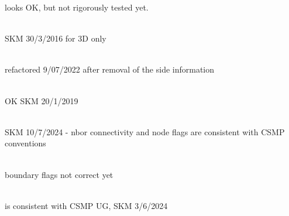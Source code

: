 \begin{DoxyRefList}
\label{test__test000073}%
%
looks OK, but not rigorously tested yet.  
\item[Member \doxylink{namespacecsmp_af885c51d2b360d64e5af0d6790f6076d}{csmp\+::check\+Neighbor\+Normals\+For\+Consistent\+Orientation} (const \doxylink{classcsmp_1_1_region}{Region$<$ 3\+U $>$} \&subdomain)]\hfill \\
\label{test__test000048}%
%
SKM 30/3/2016 for 3D only 
\item[Member \doxylink{namespacecsmp_a82f94771885b8a2a53898e22fe91e492}{csmp\+::consistency\+Check} (const \doxylink{classcsmp_1_1_node_manifold}{Node\+Manifold$<$ dim $>$} \&, bool verbose)]\hfill \\
\label{test__test000052}%
%
refactored 9/07/2022 after removal of the side information 
\item[Member \doxylink{namespacecsmp_ad6b8e1a9caaeee91e91c5f0dcfc9a749}{csmp\+::continuous\+Phases} (const variables\+::\+Variable\+Set\+\_\+\+CO2\+Geo\+Sequestration \&, const \doxylink{classcsmp_1_1_element}{Element$<$ dim $>$} \texorpdfstring{$\ast$}{*})]\hfill \\
\label{test__test000003}%
%
OK SKM 20/1/2019  
\item[Member \doxylink{namespacecsmp_a8f83c65cbfadca7865be2a363faf9f8f}{csmp\+::create\+\_\+\+Hexahedra\+\_\+\+VSet} (\doxylink{classcsmp_1_1_v_set}{VSet$<$ 3\+U $>$} \&, bool b\+Skewed=false)]\hfill \\
\label{test__test000076}%
%
SKM 10/7/2024 -\/ nbor connectivity and node flags are consistent with CSMP conventions  
\item[Member \doxylink{namespacecsmp_aca692e5648068a213cf50fbc84eec6fc}{csmp\+::create\+\_\+\+Pyramid\+\_\+\+Hexa\+\_\+\+VSet} (\doxylink{classcsmp_1_1_v_set}{VSet$<$ 3\+U $>$} \&, bool b\+Skewed=false)]\hfill \\
\label{test__test000077}%
%
boundary flags not correct yet  
\item[Member \doxylink{namespacecsmp_abdd3827f503fb175b6dcf432ecbeedd1}{csmp\+::create\+\_\+\+Tetra\+\_\+\+VSet} (\doxylink{classcsmp_1_1_v_set}{VSet$<$ 3\+U $>$} \&)]\hfill \\
\label{test__test000078}%
%
is consistent with CSMP UG, SKM 3/6/2024  
\item[Member \doxylink{group___c_s_m_pglobal_functions_ga8f46d59167925a8dcc28eadb6bd665ec}{csmp\+::d\+N\+\_\+\+To3\+DOF} (uint32\+\_\+t nodes, \doxylink{classcsmp_1_1_dense_matrix}{Dense\+Matrix$<$ DM\+\_\+\+MIN $>$} \&DN)]\hfill \\

\end{DoxyRefList}

